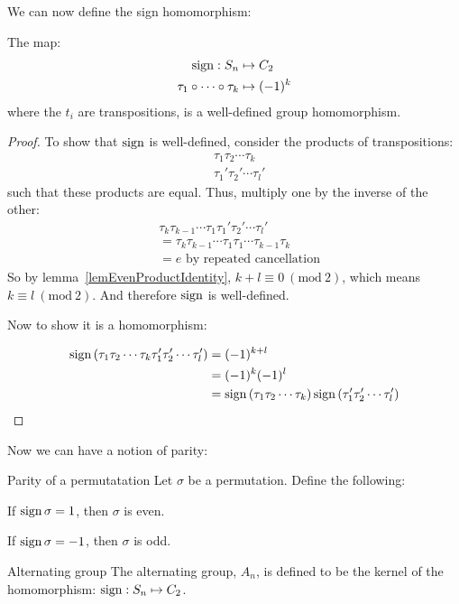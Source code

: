 \documentclass[../Main.tex]{subfiles}
\begin{document}
We can now define the sign homomorphism:
\begin{theorem}
    The map:
    \begin{align*}
        \operatorname{sign} : S_n &\mapsto C_2 \\
        \tau_1 \circ \cdots \circ \tau_k &\mapsto (-1)^k
    \end{align*}
    where the $t_i$ are transpositions, is a well-defined group homomorphism.
    \label{thmSignHism}
\end{theorem}
\begin{proof}
    To show that $\operatorname{sign}$ is well-defined, consider the products of transpositions:
    \begin{align*}
        &\tau_1 \tau_2 \cdots \tau_k \\
        &\tau_1' \tau_2' \cdots \tau_l'
    \end{align*}
    such that these products are equal. Thus, multiply one by the inverse of the other:
    \begin{align*}
        &\tau_k \tau_{k-1} \cdots \tau_1 \tau_1' \tau_2' \cdots \tau_l' \\
        &= \tau_k \tau_{k-1} \cdots \tau_1 \tau_1 \cdots \tau_{k-1} \tau_k \\
        &= e \text{ by repeated cancellation}
    \end{align*}
    So by lemma~\ref{lemEvenProductIdentity}, $k + l \equiv 0~(\text{mod}~2)$, which means $k \equiv l~(\text{mod}~2)$. And therefore $\operatorname{sign}$ is well-defined.\par
    Now to show it is a homomorphism:\par
    \begin{align*}
        \operatorname{sign}{(\tau_1 \tau_2 \cdots \tau_k \tau_1' \tau_2' \cdots \tau_l')} &= (-1)^{k + l} \\
        &= (-1)^k (-1)^l \\
        &= \operatorname{sign}{(\tau_1 \tau_2 \cdots \tau_k)} \operatorname{sign}{(\tau_1' \tau_2' \cdots \tau_l')}
    \end{align*}
\end{proof}
Now we can have a notion of parity:
\begin{definition}{Parity of a permutatation}
    Let $\sigma$ be a permutation. Define the following:\par
    If $\operatorname{sign}{\sigma} = 1$, then $\sigma$ is even. \par
    If $\operatorname{sign}{\sigma} = -1$, then $\sigma$ is odd.
\end{definition}
\begin{definition}{Alternating group}
    The alternating group, $A_n$, is defined to be the kernel of the homomorphism:
    $\operatorname{sign} : S_n \mapsto C_2$.    
\end{definition}
\end{document}
